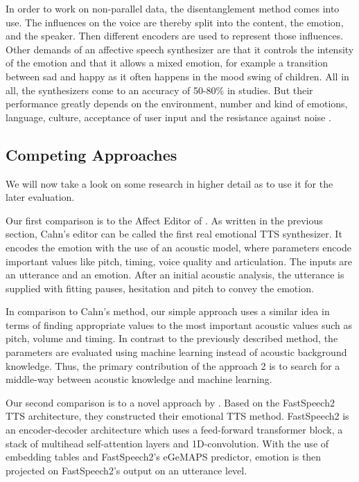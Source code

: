 \documentclass[11pt]{article}
\begin{document}
In order to work on non-parallel data, the disentanglement method comes into use. The influences on the voice are thereby split into the content, the emotion, and the speaker. Then different encoders are used to represent those influences.
Other demands of an affective speech synthesizer are that it controls the intensity of the emotion and that it allows a mixed emotion, for example a transition between sad and happy as it often happens in the mood swing of children. All in all, the synthesizers come to an accuracy of 50-80\% in studies. But their performance greatly depends on the environment, number and kind of emotions, language, culture, acceptance of user input and the resistance against noise \cite{triantafyllopoulos_overview_2023}.


\subsection{Competing Approaches}
We will now take a look on some research in higher detail as to use it for the later evaluation. 

Our first comparison is to the Affect Editor of \cite{cahn_generation_nodate}. As written in the previous section, Cahn's editor can be called the first real emotional TTS synthesizer. It encodes the emotion with the use of an acoustic model, where parameters encode important values like pitch, timing, voice quality and articulation. The inputs are an utterance and an emotion. After an initial acoustic analysis, the utterance is supplied with fitting pauses, hesitation and pitch to convey the emotion.

In comparison to Cahn's method, our simple approach uses a similar idea in terms of finding appropriate values to the most important acoustic values such as pitch, volume and timing. In contrast to the previously described method, the parameters are evaluated using machine learning instead of acoustic background knowledge. Thus, the primary contribution of the approach 2 is to search for a middle-way between acoustic knowledge and machine learning.

Our second comparison is to a novel approach by \cite{diatlova_emospeech_2023}. Based on the FastSpeech2 TTS architecture, they constructed their emotional TTS method. FastSpeech2 is an encoder-decoder architecture which uses a feed-forward transformer block, a stack of multihead self-attention layers and 1D-convolution. With the use of embedding tables and FastSpeech2's eGeMAPS predictor, emotion is then projected on FastSpeech2's output on an utterance level.
\\
\end{document}
